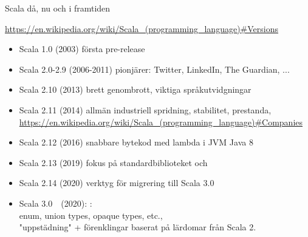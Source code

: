 %
%
%




\begin{Slide}{Scala då, nu och i framtiden}\SlideFontSmall

{\url{
https://en.wikipedia.org/wiki/Scala_(programming_language)#Versions
}}

\begin{itemize}
\item Scala 1.0 (2003) första pre-release
\item Scala 2.0-2.9 (2006-2011) pionjärer: Twitter, LinkedIn, The Guardian, ...
\item Scala 2.10 (2013) brett genombrott, viktiga språkutvidgningar
\item Scala 2.11 (2014) allmän industriell spridning, stabilitet, prestanda, \\
{\url{
https://en.wikipedia.org/wiki/Scala_(programming_language)#Companies
}}
\item Scala 2.12 (2016) snabbare bytekod med lambda i JVM Java 8
\item Scala 2.13 (2019) fokus på standardbiblioteket och 
\item Scala 2.14 (2020) verktyg för migrering till Scala 3.0
\item Scala 3.0~~(2020):  :\\enum, union types, opaque types, etc.,\\ "uppstädning" + förenklingar baserat på lärdomar från Scala 2.
\end{itemize}
\end{Slide}

